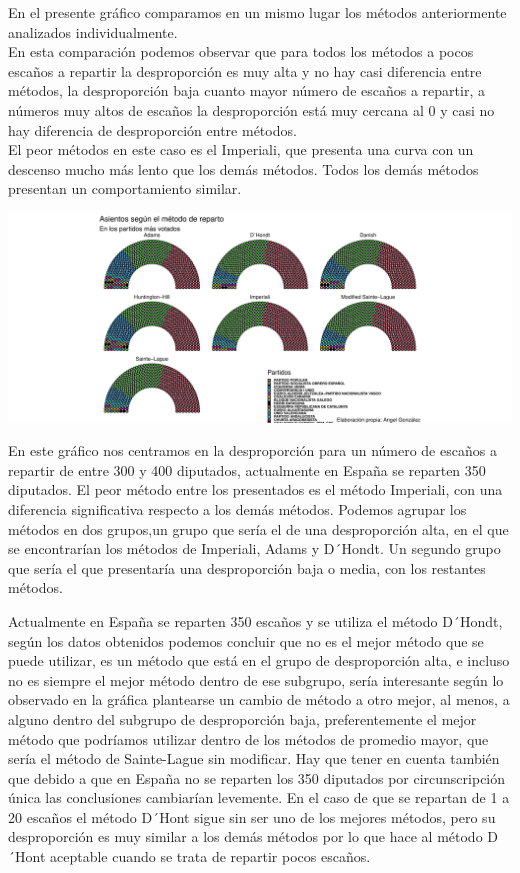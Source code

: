 \documentclass[12pt,a4paper,]{book}
\numberwithin{dummy}{section}
\theoremstyle{ocrenumbox}
\theoremstyle{blacknumex}
\theoremstyle{blacknumbox}
\theoremstyle{ocrenum}
\theoremstyle{ocrenum}
\begin{document}
En el presente gráfico comparamos en un mismo lugar los métodos
anteriormente analizados individualmente.\\
En esta comparación podemos observar que para todos los métodos a pocos
escaños a repartir la desproporción es muy alta y no hay casi diferencia
entre métodos, la desproporción baja cuanto mayor número de escaños a
repartir, a números muy altos de escaños la desproporción está muy
cercana al 0 y casi no hay diferencia de desproporción entre métodos.\\
El peor métodos en este caso es el Imperiali, que presenta una curva con
un descenso mucho más lento que los demás métodos. Todos los demás
métodos presentan un comportamiento similar.

\begin{center}\includegraphics[width=0.95\linewidth]{figurasR/unnamed-chunk-65-1} \end{center}

En este gráfico nos centramos en la desproporción para un número de
escaños a repartir de entre 300 y 400 diputados, actualmente en España
se reparten 350 diputados. El peor método entre los presentados es el
método Imperiali, con una diferencia significativa respecto a los demás
métodos. Podemos agrupar los métodos en dos grupos,un grupo que sería el
de una desproporción alta, en el que se encontrarían los métodos de
Imperiali, Adams y D´Hondt. Un segundo grupo que sería el que
presentaría una desproporción baja o media, con los restantes métodos.

Actualmente en España se reparten 350 escaños y se utiliza el método
D´Hondt, según los datos obtenidos podemos concluir que no es el mejor
método que se puede utilizar, es un método que está en el grupo de
desproporción alta, e incluso no es siempre el mejor método dentro de
ese subgrupo, sería interesante según lo observado en la gráfica
plantearse un cambio de método a otro mejor, al menos, a alguno dentro
del subgrupo de desproporción baja, preferentemente el mejor método que
podríamos utilizar dentro de los métodos de promedio mayor, que sería el
método de Sainte-Lague sin modificar. Hay que tener en cuenta también
que debido a que en España no se reparten los 350 diputados por
circunscripción única las conclusiones cambiarían levemente. En el caso
de que se repartan de 1 a 20 escaños el método D´Hont sigue sin ser uno
de los mejores métodos, pero su desproporción es muy similar a los demás
métodos por lo que hace al método D´Hont aceptable cuando se trata de
repartir pocos escaños.
\end{document}
